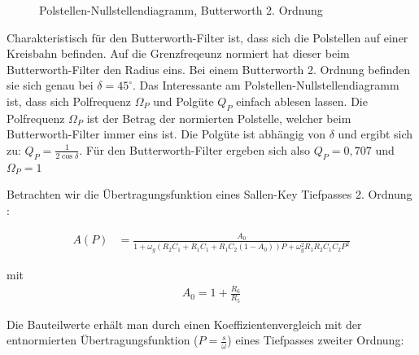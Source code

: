 \begin{figure}[H]
\centering
{}
\caption{Polstellen-Nullstellendiagramm, Butterworth 2. Ordnung}
\label{fig:filter_polnul}
\end{figure}



Charakteristisch für den Butterworth-Filter ist, dass sich die Polstellen auf einer Kreisbahn befinden. Auf die Grenzfreqeunz normiert hat dieser beim Butterworth-Filter den Radius
eins. Bei einem Butterworth 2. Ordnung befinden sie sich genau bei $\delta=45^\circ$. Das Interessante am Polstellen-Nullstellendiagramm ist, dass sich Polfrequenz $\Omega_P$ und 
Polgüte $Q_P$ einfach ablesen lassen. Die Polfrequenz $\Omega_P$ ist der Betrag der normierten Polstelle, welcher beim Butterworth-Filter immer eins ist.
Die Polgüte ist abhängig von $\delta$ und ergibt sich zu: $Q_P=\frac{1}{2\cos{\delta}}$. Für den Butterworth-Filter ergeben sich also $Q_P=0,707$ und $\Omega_P=1$

Betrachten wir die Übertragungsfunktion eines Sallen-Key Tiefpasses 2. Ordnung \cite[S. 101]{Krucker2000}:

\begin{align*}
A(P)&=\frac{A_0}{1+\omega_g (R_2 C_1 + R_1 C_1 + R_1 C_2(1-A_0))P + \omega_g^2R_1 R_2 C_1C_2P^2}
\end{align*}

mit
\begin{align*}
A_0=1+\frac{R_6}{R_5}
\end{align*}


Die Bauteilwerte erhält man durch einen Koeffizientenvergleich mit der entnormierten
Übertragungsfunktion ($P=\frac{s}{\omega}$) eines Tiefpasses zweiter Ordnung:

